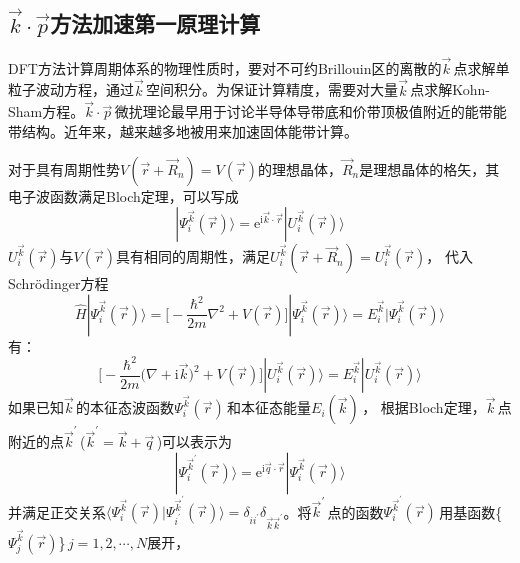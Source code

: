 \subsection{$\vec k\cdot\vec p$方法加速第一原理计算}
\textrm{DFT}方法计算周期体系的物理性质时，要对不可约\textrm{Brillouin}区的离散的$\vec k$\,点求解单粒子波动方程，通过$\vec k$\,空间积分。为保证计算精度，需要对大量$\vec k$\,点求解\textrm{Kohn-Sham}方程。$\vec k\cdot\vec p$\,微扰理论最早用于讨论半导体导带底和价带顶极值附近的能带能带结构。近年来，越来越多地被用来加速固体能带计算。

对于具有周期性势$V(\vec r+\vec R_n)=V(\vec r)$的理想晶体，$\vec R_n$是理想晶体的格矢，其电子波函数满足\textrm{Bloch}定理，可以写成
\begin{equation}
  |\Psi^{\vec k}_i(\vec r)\rangle=\mathrm e^{\mathrm i\vec k\cdot\vec r}|U^{\vec k}_i(\vec r)\rangle
  \label{eq:per-Bloch2}
\end{equation}
$U^{\vec k}_i(\vec r)$与$V(\vec r)$具有相同的周期性，满足$U^{\vec k}_i(\vec r+\vec R_n)=U^{\vec k}_i(\vec r)$，
代入\textrm{Schr\"odinger}方程%
\begin{equation}
  \hat H|\Psi^{\vec k}_i(\vec r)\rangle=\bigg[-\dfrac{\hbar^2}{2m}\nabla^2+V(\vec r)\bigg]|\Psi^{\vec k}_i(\vec r)\rangle=E^{\vec k}_i|\Psi^{\vec k}_i(\vec r)\rangle
  \label{eq:per-Sch}
\end{equation}
有：
\begin{equation}
  \bigg[-\dfrac{\hbar^2}{2m}\bigg(\nabla+\mathrm i\vec k\bigg)^2+V(\vec r)\bigg]|U^{\vec k}_i(\vec r)\rangle=E^{\vec k}_i|U^{\vec k}_i(\vec r)\rangle
  \label{eq:derived-2}
\end{equation}
如果已知$\vec k$\,的本征态波函数$\Psi_i^{\vec k}(\vec r)$\,和本征态能量$E_i(\vec k)$\,，
根据\textrm{Bloch}定理，$\vec k$\,点附近的点$\vec k^{\prime}$\,($\vec k^{\prime}=\vec k+\vec q$\,)可以表示为
\begin{equation}
  |\Psi_i^{\vec k^{\prime}}(\vec r)\rangle=\mathrm e^{\mathrm i\vec q\cdot\vec r}|\Psi_i^{\vec k}(\vec r)\rangle
  \label{eq:per-Bloch1}
\end{equation}
并满足正交关系$\langle\Psi_i^{\vec k}(\vec r)|\Psi_{i^{\prime}}^{\vec k^{\prime}}(\vec r)\rangle=\delta_{ii^{\prime}}\delta_{\vec k\vec k^{\prime}}$。将$\vec k^{\prime}$\,点的函数$\Psi_i^{\vec k^{\prime}}(\vec r)$\,用基函数\{$\Psi_j^{\vec k}(\vec r)$\}\,$j=1,2,\cdots,N$展开，
